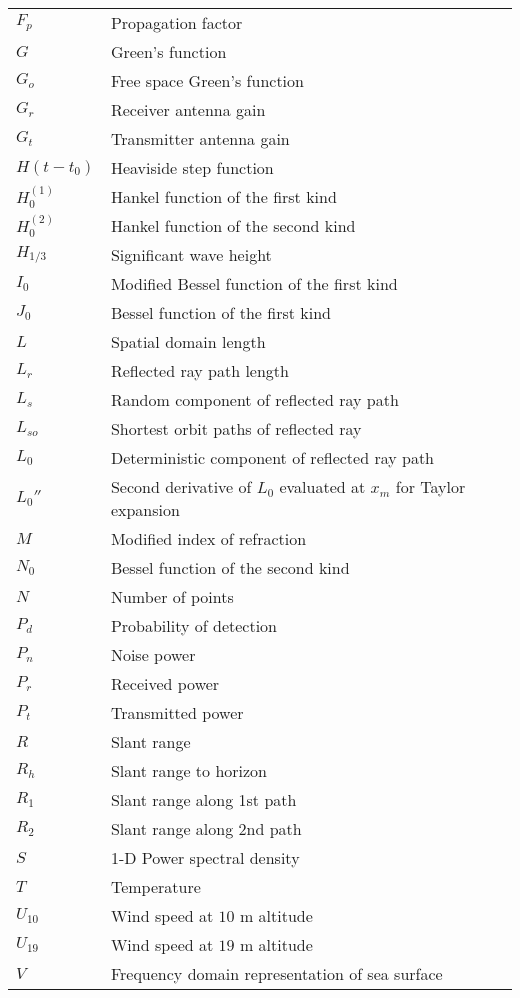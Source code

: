 \begin{supertabular}{ll}
$F_p$ & Propagation factor \\
$G$ & Green's function \\
$G_o$ & Free space Green's function \\
$G_r$ & Receiver antenna gain \\
$G_t$ & Transmitter antenna gain \\
$H(t-t_0)$ & Heaviside step function \\
$H_0^{(1)}$ & Hankel function of the first kind \\
$H_0^{(2)}$ & Hankel function of the second kind \\
$H_{1/3}$ & Significant wave height \\
$I_0$ & Modified Bessel function of the first kind \\
$J_0$ & Bessel function of the first kind \\
$L$ & Spatial domain length \\
$L_r$ & Reflected ray path length \\
$L_s$ & Random component of reflected ray path \\
$L_{so}$ & Shortest orbit paths of reflected ray \\
$L_0$ & Deterministic component of reflected ray path \\
$L_0''$ & Second derivative of $L_0$ evaluated at $x_m$ for Taylor expansion\\
$M$ & Modified index of refraction \\
$N_0$ & Bessel function of the second kind \\
$N$ & Number of points \\
$P_d$ & Probability of detection \\
$P_n$ & Noise power\\
$P_r$ & Received power \\
$P_t$ & Transmitted power \\
$R$ & Slant range \\
$R_h$ & Slant range to horizon \\
$R_1$ & Slant range along 1st path \\
$R_2$ & Slant range along 2nd path \\
$S$ & 1-D Power spectral density \\
$T$ & Temperature \\
$U_{10}$ & Wind speed at $10$ m altitude \\
$U_{19}$ & Wind speed at $19$ m altitude \\
$V$ & Frequency domain representation of sea surface\\

\end{supertabular}
